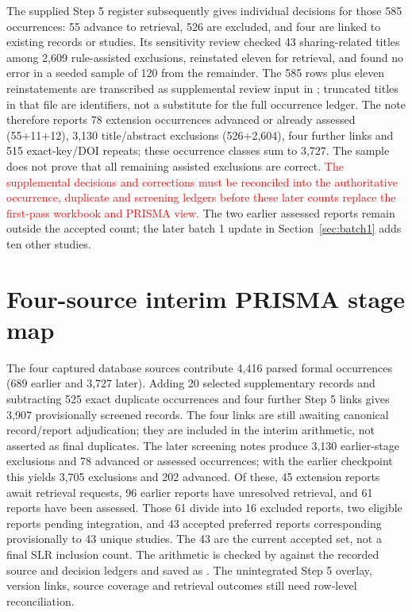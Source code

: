 \documentclass[12pt,a4paper]{article}
\newcommand{\pending}[1]{\textcolor{red}{#1}}
\begin{document}
The supplied Step 5 register subsequently gives individual decisions for those 585 occurrences: 55 advance to retrieval, 526 are excluded, and four are linked to existing records or studies. Its sensitivity review checked 43 sharing-related titles among 2,609 rule-assisted exclusions, reinstated eleven for retrieval, and found no error in a seeded sample of 120 from the remainder. The 585 rows plus eleven reinstatements are transcribed as supplemental review input in ; truncated titles in that file are identifiers, not a substitute for the full occurrence ledger. The note therefore reports 78 extension occurrences advanced or already assessed (55+11+12), 3,130 title/abstract exclusions (526+2,604), four further links and 515 exact-key/DOI repeats; these occurrence classes sum to 3,727. The sample does not prove that all remaining assisted exclusions are correct. \pending{The supplemental decisions and corrections must be reconciled into the authoritative occurrence, duplicate and screening ledgers before these later counts replace the first-pass workbook and PRISMA view.} The two earlier assessed reports remain outside the accepted count; the later batch 1 update in Section~\ref{sec:batch1} adds ten other studies.


\section{Four-source interim PRISMA stage map}
The four captured database sources contribute 4,416 parsed formal occurrences (689 earlier and 3,727 later). Adding 20 selected supplementary records and subtracting 525 exact duplicate occurrences and four further Step 5 links gives 3,907 provisionally screened records. The four links are still awaiting canonical record/report adjudication; they are included in the interim arithmetic, not asserted as final duplicates. The later screening notes produce 3,130 earlier-stage exclusions and 78 advanced or assessed occurrences; with the earlier checkpoint this yields 3,705 exclusions and 202 advanced. Of these, 45 extension reports await retrieval requests, 96 earlier reports have unresolved retrieval, and 61 reports have been assessed. Those 61 divide into 16 excluded reports, two eligible reports pending integration, and 43 accepted preferred reports corresponding provisionally to 43 unique studies. The 43 are the current accepted set, not a final SLR inclusion count. The arithmetic is checked by  against the recorded source and decision ledgers and saved as . The unintegrated Step 5 overlay, version links, source coverage and retrieval outcomes still need row-level reconciliation.

\end{document}
